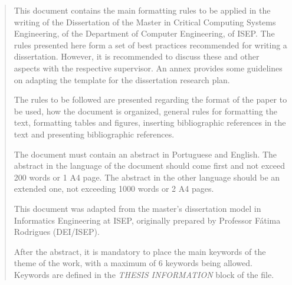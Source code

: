 \begin{abstract}


This document contains the main formatting rules to be applied in the writing of the Dissertation of the Master in Critical Computing Systems Engineering, of the Department of Computer Engineering, of ISEP. The rules presented here form a set of best practices recommended for writing a dissertation. However, it is recommended to discuss these and other aspects with the respective supervisor. An annex provides some guidelines on adapting the template for the dissertation research plan.

The rules to be followed are presented regarding the format of the paper to be used, how the document is organized, general rules for formatting the text, formatting tables and figures, inserting bibliographic references in the text and presenting bibliographic references.

The document must contain an abstract in Portuguese and English. The abstract in the  language of the document should come first and not exceed 200 words or 1 A4 page. The abstract in the other language should be an extended one, not exceeding 1000 words or 2 A4 pages.

This document was adapted from the master's dissertation model in Informatics Engineering at ISEP, originally prepared by Professor Fátima Rodrigues (DEI/ISEP).

After the abstract, it is mandatory to place the main keywords of the theme of the work, with a maximum of 6 keywords being allowed. Keywords are defined in the \emph{THESIS INFORMATION} block of the  file.

\end{abstract}

